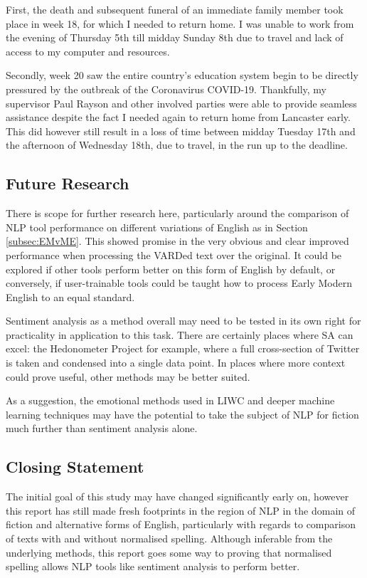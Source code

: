 \documentclass{article}
\begin{document}
{        First, the death and subsequent funeral of an immediate family member took place in week 18, for which I needed to return home. I was unable to work from the evening of Thursday 5th till midday Sunday 8th due to travel and lack of access to my computer and resources.

        Secondly, week 20 saw the entire country's education system begin to be directly pressured by the outbreak of the Coronavirus COVID-19. Thankfully, my supervisor Paul Rayson and other involved parties were able to provide seamless assistance despite the fact I needed again to return home from Lancaster early. This did however still result in a loss of time between midday Tuesday 17th and the afternoon of Wednesday 18th, due to travel, in the run up to the deadline.
    \subsection{Future Research}
        There is scope for further research here, particularly around the comparison of NLP tool performance on different variations of English as in Section \ref{subsec:EMvME}. This showed promise in the very obvious and clear improved performance when processing the VARDed text over the original. It could be explored if other tools perform better on this form of English by default, or conversely, if user-trainable tools could be taught how to process Early Modern English to an equal standard.

        Sentiment analysis as a method overall may need to be tested in its own right for practicality in application to this task. There are certainly places where SA can excel: the Hedonometer Project for example, where a full cross-section of Twitter is taken and condensed into a single data point. In places where more context could prove useful, other methods may be better suited. 
        
        As a suggestion, the emotional methods used in LIWC and deeper machine learning techniques may have the potential to take the subject of NLP for fiction much further than sentiment analysis alone.
    \subsection{Closing Statement}
        The initial goal of this study may have changed significantly early on, however this report has still made fresh footprints in the region of NLP in the domain of fiction and alternative forms of English, particularly with regards to comparison of texts with and without normalised spelling. Although inferable from the underlying methods, this report goes some way to proving that normalised spelling allows NLP tools like sentiment analysis to perform better.

}
\end{document}
